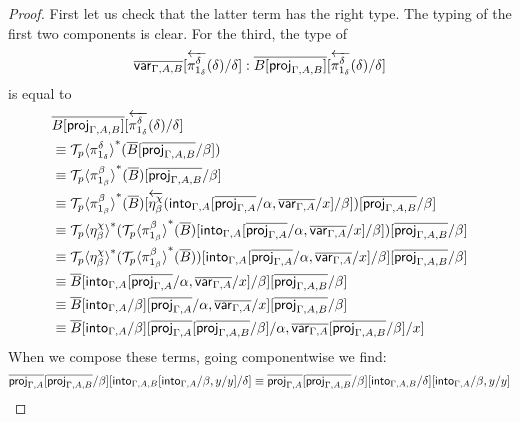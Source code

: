 \documentclass[10pt]{article}
\theoremstyle{definition}
\newcommand{\rewrite}[2]{\overleftarrow{#1}(#2)}
\newcommand\St[2]{\ensuremath{{#1}^*(#2)}}
\newcommand\ApEl[2]{\mathcal{T}_{#1}\langle#2\rangle}
\begin{document}
\begin{proof}
First let us check that the latter term has the right type. The typing of the first two components is clear. For the third, the type of 
\begin{align*}
\upstairs{\qvar{\Gamma, A, B}}[\rewrite{\pi^\delta_{1_\delta}}{\delta}/\delta] : \upstairs{B[\proj{\Gamma, A, B}]}[\rewrite{\pi^\delta_{1_\delta}}{\delta}/\delta]
\end{align*}
is equal to
\begin{align*}
&\upstairs{B[\proj{\Gamma, A, B}]}[\rewrite{\pi^\delta_{1_\delta}}{\delta}/\delta] \\
&\equiv \St{\ApEl{p}{\pi^\delta_{1_\delta}}}{\upstairs{B}[\upstairs{\proj{\Gamma, A, B}}/\beta]} \\
&\equiv \St{\ApEl{p}{\pi^\beta_{1_\beta}}}{\upstairs{B}}[\upstairs{\proj{\Gamma, A, B}}/\beta] \\
&\equiv \St{\ApEl{p}{\pi^\beta_{1_\beta}}}{\upstairs{B}}[\rewrite{\eta^\chi_\beta}{\into{\Gamma, A}[\upstairs{\proj{\Gamma, A}}/\alpha, \upstairs{\qvar{\Gamma, A}}/x]/\beta]}[\upstairs{\proj{\Gamma, A, B}}/\beta] \\
&\equiv \St{\ApEl{p}{\eta^\chi_\beta}}{\St{\ApEl{p}{\pi^\beta_{1_\beta}}}{\upstairs{B}}[\into{\Gamma, A}[\upstairs{\proj{\Gamma, A}}/\alpha, \upstairs{\qvar{\Gamma, A}}/x]/\beta]}[\upstairs{\proj{\Gamma, A, B}}/\beta] \\
&\equiv \St{\ApEl{p}{\eta^\chi_\beta}}{\St{\ApEl{p}{\pi^\beta_{1_\beta}}}{\upstairs{B}}}[\into{\Gamma, A}[\upstairs{\proj{\Gamma, A}}/\alpha, \upstairs{\qvar{\Gamma, A}}/x]/\beta][\upstairs{\proj{\Gamma, A, B}}/\beta] \\
&\equiv \upstairs{B}[\into{\Gamma, A}[\upstairs{\proj{\Gamma, A}}/\alpha, \upstairs{\qvar{\Gamma, A}}/x]/\beta][\upstairs{\proj{\Gamma, A, B}}/\beta] \\
&\equiv \upstairs{B}[\into{\Gamma, A}/\beta][\upstairs{\proj{\Gamma, A}}/\alpha, \upstairs{\qvar{\Gamma, A}}/x][\upstairs{\proj{\Gamma, A, B}}/\beta] \\
&\equiv \upstairs{B}[\into{\Gamma, A}/\beta][\upstairs{\proj{\Gamma, A}}[\upstairs{\proj{\Gamma, A, B}}/\beta]/\alpha, \upstairs{\qvar{\Gamma, A}}[\upstairs{\proj{\Gamma, A, B}}/\beta]/x]
\end{align*}
When we compose these terms, going componentwise we find:
\begin{align*}
\upstairs{\proj{\Gamma, A}}[\upstairs{\proj{\Gamma, A, B}}/\beta][\into{\Gamma, A, B}[\into{\Gamma, A}/\beta, y/y]/\delta] 
&\equiv \upstairs{\proj{\Gamma, A}}[\upstairs{\proj{\Gamma, A, B}}/\beta][\into{\Gamma, A, B}/\delta][\into{\Gamma, A}/\beta, y/y] \\

\end{align*}
\end{proof}
\end{document}
